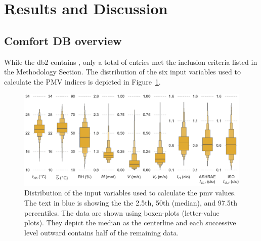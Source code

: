 \section{Results and Discussion}\label{sec:results}

\subsection{Comfort DB overview}\label{subsec:comfort-db-overview}
While the \gls{db2} contains , only a total of  entries met the inclusion criteria listed in the Methodology Section.
The distribution of the six input variables used to calculate the PMV indices is depicted in Figure~\ref{fig:dist_input_data}.

\begin{figure}[htb!]
    \centering
    \includegraphics[width=\textwidth]{figures/dist_input_data}
    \caption{Distribution of the input variables used to calculate the \ac{pmv} values.
    The text in blue is showing the the 2.5th, 50th (median), and 97.5th percentiles.
    The data are shown using boxen-plots (letter-value plots).
    They depict the median as the centerline and each successive level outward contains half of the remaining data.}
    \label{fig:dist_input_data}
\end{figure}

